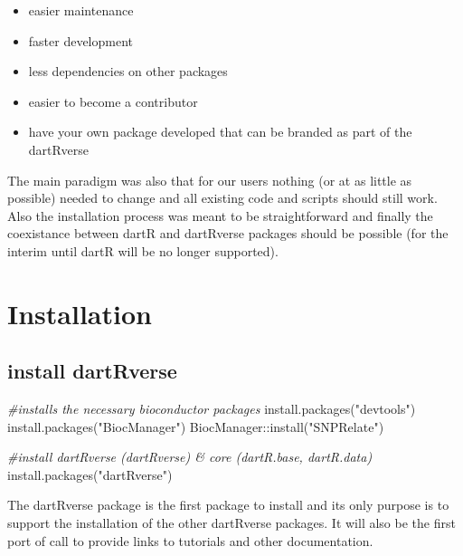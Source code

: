 \documentclass[
  letterpaper,
  DIV=11,
  numbers=noendperiod]{scrreprt}
\newenvironment{Shaded}{\begin{snugshade}}{\end{snugshade}}
\newcommand{\CommentTok}[1]{\textcolor[rgb]{0.38,0.63,0.69}{\textit{#1}}}
\newcommand{\FunctionTok}[1]{\textcolor[rgb]{0.02,0.16,0.49}{#1}}
\newcommand{\NormalTok}[1]{\textcolor[rgb]{0.00,0.44,0.13}{#1}}
\newcommand{\SpecialCharTok}[1]{\textcolor[rgb]{0.25,0.44,0.63}{#1}}
\newcommand{\StringTok}[1]{\textcolor[rgb]{0.25,0.44,0.63}{#1}}
\providecommand{\tightlist}{%
  \setlength{\itemsep}{0pt}\setlength{\parskip}{0pt}}\usepackage{longtable,booktabs,array}
\begin{document}
\begin{itemize}
\tightlist
\item
  easier maintenance
\item
  faster development
\item
  less dependencies on other packages
\item
  easier to become a contributor
\item
  have your own package developed that can be branded as part of the
  dartRverse
\end{itemize}

The main paradigm was also that for our users nothing (or at as little
as possible) needed to change and all existing code and scripts should
still work. Also the installation process was meant to be
straightforward and finally the coexistance between dartR and dartRverse
packages should be possible (for the interim until dartR will be no
longer supported).

\hypertarget{installation}{%
\section*{Installation}\label{installation}}


\hypertarget{install-dartrverse}{%
\subsection*{install dartRverse}\label{install-dartrverse}}

\begin{Shaded}
\begin{Highlighting}[]
\CommentTok{\#installs the necessary bioconductor packages}
\FunctionTok{install.packages}\NormalTok{(}\StringTok{"devtools"}\NormalTok{)}
\FunctionTok{install.packages}\NormalTok{(}\StringTok{"BiocManager"}\NormalTok{)}
\NormalTok{BiocManager}\SpecialCharTok{::}\FunctionTok{install}\NormalTok{(}\StringTok{"SNPRelate"}\NormalTok{)}

\CommentTok{\#install dartRverse (dartRverse) \& core (dartR.base, dartR.data)}
\FunctionTok{install.packages}\NormalTok{(}\StringTok{"dartRverse"}\NormalTok{)}
\end{Highlighting}
\end{Shaded}

The dartRverse package is the first package to install and its only
purpose is to support the installation of the other dartRverse packages.
It will also be the first port of call to provide links to tutorials and
other documentation.
\end{document}
